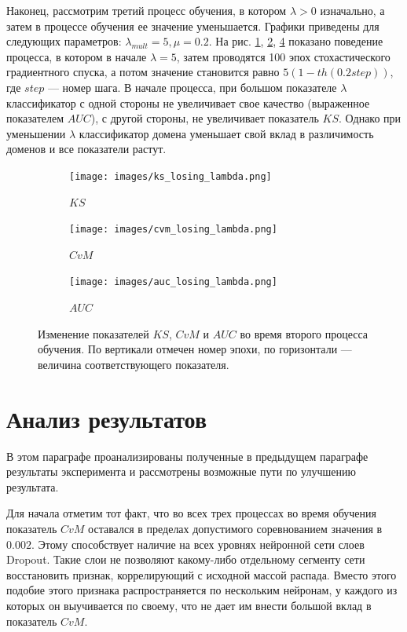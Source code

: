 \documentclass[14pt, a4paper]{extarticle}
\begin{document}
Наконец, рассмотрим третий процесс обучения, в котором $\lambda > 0$ изначально, а затем в процессе обучения ее значение уменьшается. Графики приведены для следующих параметров: $\lambda_{mult} = 5, \mu = 0.2$. На рис. \ref{figure:losing_lambda_results_ks}, \ref{figure:losing_lambda_results_cvm}, \ref{figure:losing_lambda_results_auc} показано поведение процесса, в котором в начале $\lambda=5$, затем проводятся 100 эпох стохастического градиентного спуска, а потом значение становится равно $5(1 - th(0.2step))$, где $step$ — номер шага. В начале процесса, при большом показателе $\lambda$ классификатор с одной стороны не увеличивает свое качество (выраженное показателем $AUC$), с другой стороны, не увеличивает показатель $KS$. Однако при уменьшении $\lambda$ классификатор домена уменьшает свой вклад в различимость доменов и все показатели растут.

\begin{figure}
\begin{subfigure}{.5\textwidth}
	\centering
	\texttt{[image: images/ks\_losing\_lambda.png]}
	\caption{$KS$}
	\label{figure:losing_lambda_results_ks}
\end{subfigure}
\begin{subfigure}{.5\textwidth}
	\centering
	\texttt{[image: images/cvm\_losing\_lambda.png]}
	\caption{$CvM$}
	\label{figure:losing_lambda_results_cvm}
\end{subfigure}
\begin{subfigure}{.5\textwidth}
	\centering
	\texttt{[image: images/auc\_losing\_lambda.png]}
	\caption{$AUC$}
	\label{figure:losing_lambda_results_auc}
\end{subfigure}
\caption{Изменение показателей $KS$, $CvM$ и $AUC$ во время второго процесса обучения.
По вертикали отмечен номер эпохи, по горизонтали — величина соответствующего показателя.}
\end{figure}


\section{Анализ результатов}
\label{paragraph:analysis}

В этом параграфе проанализированы полученные в предыдущем параграфе результаты эксперимента и рассмотрены возможные пути по улучшению результата.

Для начала отметим тот факт, что во всех трех процессах во время обучения показатель $CvM$ оставался в пределах допустимого соревнованием значения в $0.002$. Этому способствует наличие на всех уровнях нейронной сети слоев Dropout. Такие слои не позволяют какому-либо отдельному сегменту сети восстановить признак, коррелирующий с исходной массой распада. Вместо этого подобие этого признака распространяется по нескольким нейронам, у каждого из которых он выучивается по своему, что не дает им внести большой вклад в показатель $CvM$.
\end{document}
